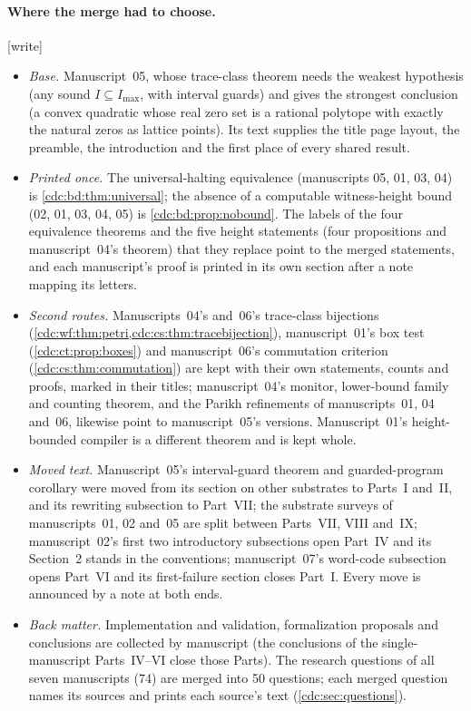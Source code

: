 \documentclass[11pt,a4paper]{article}
\theoremstyle{definition}
\theoremstyle{remark}
\newcommand{\wtag}{\textup{[write]}}%
\begin{document}
\paragraph{Where the merge had to choose.} \wtag{}
\begin{itemize}
\item \emph{Base.} Manuscript~05, whose trace-class theorem needs the weakest hypothesis (any sound $I\subseteq I_{\max}$, with interval guards) and gives the strongest conclusion (a convex quadratic whose real zero set is a rational polytope with exactly the natural zeros as lattice points). Its text supplies the title page layout, the preamble, the introduction and the first place of every shared result.
\item \emph{Printed once.} The universal-halting equivalence (manuscripts 05, 01, 03, 04) is \cref{cdc:bd:thm:universal}; the absence of a computable witness-height bound (02, 01, 03, 04, 05) is \cref{cdc:bd:prop:nobound}. The labels of the four equivalence theorems and the five height statements (four propositions and manuscript~04's theorem) that they replace point to the merged statements, and each manuscript's proof is printed in its own section after a note mapping its letters.
\item \emph{Second routes.} Manuscripts~04's and~06's trace-class bijections (\cref{cdc:wf:thm:petri,cdc:cs:thm:tracebijection}), manuscript~01's box test (\cref{cdc:ct:prop:boxes}) and manuscript~06's commutation criterion (\cref{cdc:cs:thm:commutation}) are kept with their own statements, counts and proofs, marked in their titles; manuscript~04's monitor, lower-bound family and counting theorem, and the Parikh refinements of manuscripts~01, 04 and~06, likewise point to manuscript~05's versions. Manuscript~01's height-bounded compiler is a different theorem and is kept whole.
\item \emph{Moved text.} Manuscript~05's interval-guard theorem and guarded-program corollary were moved from its section on other substrates to Parts~I and~II, and its rewriting subsection to Part~VII; the substrate surveys of manuscripts~01, 02 and~05 are split between Parts~VII, VIII and~IX; manuscript~02's first two introductory subsections open Part~IV and its Section~2 stands in the conventions; manuscript~07's word-code subsection opens Part~VI and its first-failure section closes Part~I. Every move is announced by a note at both ends.
\item \emph{Back matter.} Implementation and validation, formalization proposals and conclusions are collected by manuscript (the conclusions of the single-manuscript Parts~IV--VI close those Parts). The research questions of all seven manuscripts (74) are merged into 50 questions; each merged question names its sources and prints each source's text (\cref{cdc:sec:questions}).

\end{itemize}
\end{document}
